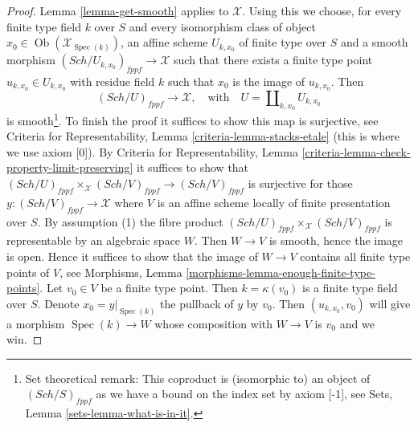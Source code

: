 \documentclass[10pt,a4paper]{amsart}
\theoremstyle{plain}
\theoremstyle{definition}
\theoremstyle{remark}
\numberwithin{equation}{subsection}
\def\Spec{\mathop{\mathrm{Spec}}}
\def\Sch{\mathit{Sch}}
\def\Ob{\mathop{\mathrm{Ob}}\nolimits}
\begin{document}
\begin{proof}
Lemma \ref{lemma-get-smooth} applies to $\mathcal{X}$. Using this we
choose, for every finite type field $k$ over $S$ and every
isomorphism class of object $x_0 \in \Ob(\mathcal{X}_{\Spec(k)})$,
an affine scheme $U_{k, x_0}$ of finite type over $S$ and a smooth morphism
$(\Sch/U_{k, x_0})_{fppf} \to \mathcal{X}$ such that there exists a finite
type point $u_{k, x_0} \in U_{k, x_0}$ with residue field $k$ such that $x_0$
is the image of $u_{k, x_0}$. Then
$$
(\Sch/U)_{fppf} \to \mathcal{X},
\quad\text{with}\quad
U = \coprod\nolimits_{k, x_0} U_{k, x_0}
$$
is smooth\footnote{Set theoretical remark: This coproduct is (isomorphic to)
an object of $(\Sch/S)_{fppf}$ as we have a bound on the index set
by axiom [-1], see Sets, Lemma \ref{sets-lemma-what-is-in-it}.}.
To finish the proof it suffices to show this map is surjective,
see Criteria for Representability, Lemma \ref{criteria-lemma-stacks-etale}
(this is where we use axiom [0]). By Criteria for Representability, Lemma
\ref{criteria-lemma-check-property-limit-preserving}
it suffices to show that
$(\Sch/U)_{fppf} \times_\mathcal{X} (\Sch/V)_{fppf} \to (\Sch/V)_{fppf}$
is surjective for those $y : (\Sch/V)_{fppf} \to \mathcal{X}$ where
$V$ is an affine scheme locally of finite presentation
over $S$. By assumption (1) the fibre product
$(\Sch/U)_{fppf} \times_\mathcal{X} (\Sch/V)_{fppf}$ is representable
by an algebraic space $W$. Then $W \to V$ is smooth, hence the image is
open. Hence it suffices to show that the image of $W \to V$ contains all
finite type points of $V$, see
Morphisms, Lemma \ref{morphisms-lemma-enough-finite-type-points}.
Let $v_0 \in V$ be a finite type point. Then $k = \kappa(v_0)$ is
a finite type field over $S$. Denote $x_0 = y|_{\Spec(k)}$
the pullback of $y$ by $v_0$. Then $(u_{k, x_0}, v_0)$ will give
a morphism $\Spec(k) \to W$ whose composition with $W \to V$
is $v_0$ and we win.
\end{proof}
\end{document}
